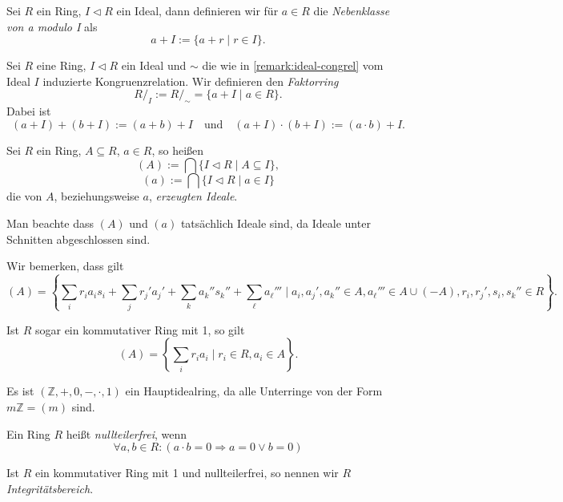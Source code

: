 \begin{definition}
    Sei $R$ ein Ring, $I \vartriangleleft R$ ein Ideal, dann definieren wir für $a \in R$ die \emph{Nebenklasse von a modulo I} als 
    $$a+I := \{ a + r \mid r \in I \}.$$
\end{definition}

\begin{definition}
    Sei $R$ eine Ring, $I \vartriangleleft R$ ein Ideal und $\sim$ die wie in \cref{remark:ideal-congrel} vom Ideal $I$ induzierte Kongruenzrelation. Wir definieren den \emph{Faktorring} 
    $$ R/_I := R/_\sim = \{ a + I \mid a \in R\}.$$
    Dabei ist
    $$ (a + I) + (b + I) := (a + b) + I \quad\text{und}\quad (a + I)\cdot(b+I) := (a\cdot b) + I. $$
\end{definition}

\begin{definition}
    Sei $R$ ein Ring, $A \subseteq R$, $a \in R$, so heißen
    $$ (A) := \bigcap \{ I \vartriangleleft R \mid A \subseteq I \}, $$
    $$ (a) := \bigcap \{ I \vartriangleleft R \mid a \in I \} $$
    die von $A$, beziehungsweise $a$, \emph{erzeugten Ideale}.
\end{definition}

\begin{remark}
    Man beachte dass $(A)$ und $(a)$ tatsächlich Ideale sind, da Ideale unter Schnitten abgeschlossen sind.
\end{remark}

\begin{remark}\label{remark:darstellung_ideal}
    Wir bemerken, dass gilt
    $$ (A) = \left\{ \sum_i r_i a_i s_i + \sum_j r_j' a_j' + \sum_k a_k'' s_k'' + \sum_\ell a_\ell''' \mid a_i, a_j', a_k'' \in A, a_\ell''' \in A \cup (-A), r_i, r_j', s_i, s_k'' \in R \right\}. $$

    Ist $R$ sogar ein kommutativer Ring mit 1, so gilt
    $$ (A) = \left\{ \sum_i r_i a_i \mid r_i \in R, a_i \in A \right\}. $$
\end{remark}

\begin{example}
    Es ist $(\mathbb{Z}, +, 0, -, \cdot, 1)$ ein Hauptidealring, da alle Unterringe von der Form $m \mathbb{Z} = (m)$ sind.
\end{example}

\begin{definition}
    Ein Ring $R$ heißt \emph{nullteilerfrei}, wenn
    $$ \forall a, b \in R: (a \cdot b = 0 \Rightarrow a = 0 \lor b = 0) $$

    Ist $R$ ein kommutativer Ring mit 1 und nullteilerfrei, so nennen wir $R$ \emph{Integritätsbereich}.
\end{definition}

